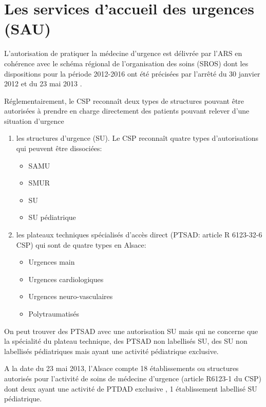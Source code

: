\documentclass[12pt,english,french,twoside]{book}\usepackage[]{graphicx}\usepackage[]{color}
\begin{document}
\section{Les services d'accueil des urgences (SAU)}


L'autorisation de pratiquer la médecine d'urgence est délivrée par l'ARS en cohérence avec le schéma régional de l'organisation des soins (SROS) dont les dispositions pour la période 2012-2016 ont été précisées par l'arrêté du 30 janvier 2012 \cite{14} et du 23 mai 2013 \cite{15}.

Réglementairement, le CSP reconnaît deux types de structures pouvant être autorisées à prendre en charge directement des patients pouvant relever d'une situation d'urgence
\begin{enumerate}
  \item les structures d'urgence (SU). Le CSP reconnaît quatre types d'autorisations qui peuvent être dissociées:
    \begin{itemize}
      \item SAMU
      \item SMUR
      \item SU
      \item SU pédiatrique
    \end{itemize}

  \item les plateaux techniques spécialisés d'accès direct (PTSAD: article R 6123-32-6 CSP) qui sont de quatre types en Alsace:
    \begin{itemize}
      \item Urgences main
      \item Urgences cardiologiques
      \item Urgences neuro-vasculaires
      \item Polytraumatisés
    \end{itemize}
\end{enumerate}

On peut trouver des PTSAD avec une autorisation SU mais qui ne concerne que la spécialité du plateau technique, des PTSAD non labellisés SU, des SU non labellisés pédiatriques mais ayant une activité pédiatrique exclusive.

A la date du 23 mai 2013, l'Alsace compte 18 établissements ou structures autorisés pour l'activité de soins de médecine d'urgence (article R6123-1 du CSP) dont deux ayant une activité de PTDAD exclusive \cite{15}, 1 établissement labellisé SU pédiatrique.
\end{document}
